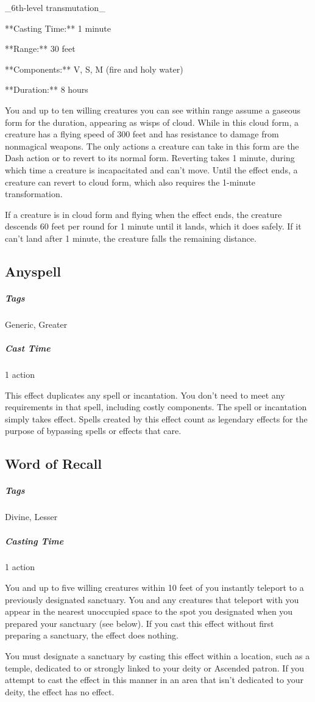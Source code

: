 _6th-level transmutation_

**Casting Time:** 1 minute

**Range:** 30 feet

**Components:** V, S, M (fire and holy water)

**Duration:** 8 hours

You and up to ten willing creatures you can see within range assume a gaseous form for the duration, appearing as wisps of cloud. While in this cloud form, a creature has a flying speed of 300 feet and has resistance to damage from nonmagical weapons. The only actions a creature can take in this form are the Dash action or to revert to its normal form. Reverting takes 1 minute, during which time a creature is incapacitated and can’t move. Until the effect ends, a creature can revert to cloud form, which also requires the 1-minute transformation.

If a creature is in cloud form and flying when the effect ends, the creature descends 60 feet per round for 1 minute until it lands, which it does safely. If it can’t land after 1 minute, the creature falls the remaining distance.

\subsection{Anyspell}
\subparagraph*{Tags} Generic, Greater
\subparagraph*{Cast Time} 1 action

This effect duplicates any spell or incantation. You don’t need to meet any requirements in that spell, including costly components. The spell or incantation simply takes effect. Spells created by this effect count as legendary effects for the purpose of bypassing spells or effects that care.

\subsection{Word of Recall}
\subparagraph*{Tags} Divine, Lesser
\subparagraph*{Casting Time} 1 action

You and up to five willing creatures within 10 feet of you instantly teleport to a previously designated sanctuary. You and any creatures that teleport with you appear in the nearest unoccupied space to the spot you designated when you prepared your sanctuary (see below). If you cast this effect without first preparing a sanctuary, the effect does nothing.

You must designate a sanctuary by casting this effect within a location, such as a temple, dedicated to or strongly linked to your deity or Ascended patron. If you attempt to cast the effect in this manner in an area that isn’t dedicated to your deity, the effect has no effect.


